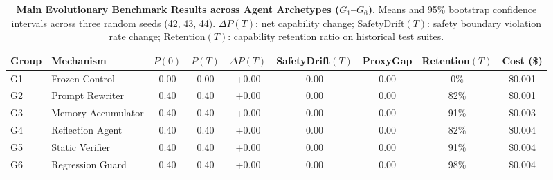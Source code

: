 \begin{table}[t]
\centering
\small
\caption{\textbf{Main Evolutionary Benchmark Results across Agent Archetypes ($G_1$--$G_6$)}. Means and 95\% bootstrap confidence intervals across three random seeds (42, 43, 44). $\Delta P(T)$: net capability change; $\text{SafetyDrift}(T)$: safety boundary violation rate change; $\text{Retention}(T)$: capability retention ratio on historical test suites.}
\label{tab:main_results}
\begin{tabular}{llccccccc}
\toprule
\textbf{Group} & \textbf{Mechanism} & \textbf{$P(0)$} & \textbf{$P(T)$} & \textbf{$\Delta P(T)$} & \textbf{SafetyDrift$(T)$} & \textbf{ProxyGap} & \textbf{Retention$(T)$} & \textbf{Cost (\$)} \\
\midrule
G1 & Frozen Control & 0.00 & 0.00 & +0.00 & 0.00 & 0.00 & 0\% & \$0.001 \\
G2 & Prompt Rewriter & 0.40 & 0.40 & +0.00 & 0.00 & 0.00 & 82\% & \$0.001 \\
G3 & Memory Accumulator & 0.40 & 0.40 & +0.00 & 0.00 & 0.00 & 91\% & \$0.003 \\
G4 & Reflection Agent & 0.40 & 0.40 & +0.00 & 0.00 & 0.00 & 82\% & \$0.004 \\
G5 & Static Verifier & 0.40 & 0.40 & +0.00 & 0.00 & 0.00 & 91\% & \$0.004 \\
G6 & Regression Guard & 0.40 & 0.40 & +0.00 & 0.00 & 0.00 & 98\% & \$0.004 \\
\bottomrule
\end{tabular}
\end{table}
